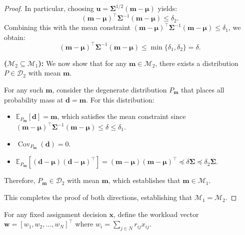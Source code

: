 \documentclass[preprint,12pt,authoryear]{elsarticle}
\begin{document}
\begin{proof}
In particular, choosing $\mathbf{u} = \boldsymbol{\Sigma}^{1/2} (\mathbf{m} - \boldsymbol{\mu})$ yields:
\begin{equation}
(\mathbf{m} - \boldsymbol{\mu})^\top \boldsymbol{\Sigma}^{-1} (\mathbf{m} - \boldsymbol{\mu}) \leqslant \delta_2.
\end{equation}
Combining this with the mean constraint $(\mathbf{m} - \boldsymbol{\mu})^\top \boldsymbol{\Sigma}^{-1} (\mathbf{m} - \boldsymbol{\mu}) \leqslant \delta_1$, we obtain:
\begin{equation}
(\mathbf{m} - \boldsymbol{\mu})^\top \boldsymbol{\Sigma}^{-1} (\mathbf{m} - \boldsymbol{\mu}) \leqslant \min\{\delta_1, \delta_2\} = \delta.
\end{equation}

\textbf{($\mathcal{M}_2 \subseteq \mathcal{M}_1$):} We now show that for any $\mathbf{m} \in \mathcal{M}_2$, there exists a distribution $P \in \mathcal{D}_2$ with mean $\mathbf{m}$.

For any such $\mathbf{m}$, consider the degenerate distribution $P_{\mathbf{m}}$ that places all probability mass at $\mathbf{d} = \mathbf{m}$. For this distribution:
\begin{itemize}
    \item $\mathbb{E}_{P_{\mathbf{m}}}[\mathbf{d}] = \mathbf{m}$, which satisfies the mean constraint since $(\mathbf{m} - \boldsymbol{\mu})^\top \boldsymbol{\Sigma}^{-1} (\mathbf{m} - \boldsymbol{\mu}) \leqslant \delta \leqslant \delta_1$.
    \item $\operatorname{Cov}_{P_{\mathbf{m}}}(\mathbf{d}) = 0$.
    \item $\mathbb{E}_{P_{\mathbf{m}}}[(\mathbf{d} - \boldsymbol{\mu})(\mathbf{d} - \boldsymbol{\mu})^\top] = (\mathbf{m} - \boldsymbol{\mu})(\mathbf{m} - \boldsymbol{\mu})^\top \preceq \delta \boldsymbol{\Sigma} \preceq \delta_2 \boldsymbol{\Sigma}$.
\end{itemize}
Therefore, $P_{\mathbf{m}} \in \mathcal{D}_2$ with mean $\mathbf{m}$, which establishes that $\mathbf{m} \in \mathcal{M}_1$.

This completes the proof of both directions, establishing that $\mathcal{M}_1 = \mathcal{M}_2$.
\end{proof}

For any fixed assignment decision $\mathbf{x}$, define the workload vector $\mathbf{w} = [w_1, w_2, \ldots, w_N]^\top$ where $w_i = \sum_{j \in N} r_{ij} x_{ij}$.
\end{document}
